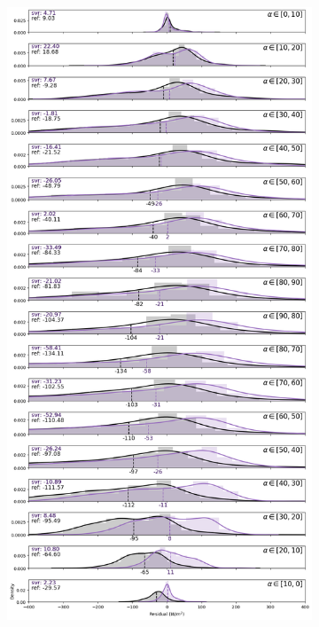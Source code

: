 \begin{figure}[htb!]
    \centering
    \begin{subfigure}{\columnwidth}
        \includegraphics[width=\columnwidth]{figures/first_study/residual_errors_svr_site1_mae.png}

\end{subfigure}
\end{figure}
